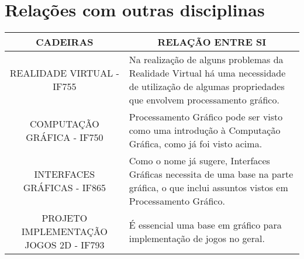\documentclass[a4paper]{article}
\begin{document}
\section*{Relações com outras disciplinas}

\begin{table}[H]
\centering
\begin{tabular}{@{}|l p{7cm}|@{}}
\toprule
\multicolumn{1}{|c|}{\textbf{CADEIRAS}}                                                 &\multicolumn{1}{|c|}{\textbf{RELAÇÃO ENTRE SI}}                                                                                                                                                                                                                                                                                                                \\ \midrule
\multicolumn{1}{|c|}{REALIDADE VIRTUAL - IF755} & Na realização de alguns problemas da Realidade Virtual há uma necessidade de utilização de algumas propriedades que envolvem processamento gráfico.                                                                                                                                                                                                            \\ \midrule
\multicolumn{1}{|c|}{COMPUTAÇÃO GRÁFICA - IF750}                                               & Processamento Gráfico pode ser visto como uma introdução à Computação Gráfica, como já foi visto acima.                                                                                                                                                                                                                                                        \\ \midrule
\multicolumn{1}{|c|}{INTERFACES GRÁFICAS - IF865}                                              & Como o nome já sugere, Interfaces Gráficas necessita de uma base na parte gráfica, o que inclui assuntos vistos em Processamento Gráfico.                                                                                                                                                                                                                      \\ \midrule
\multicolumn{1}{|c|}{PROJETO IMPLEMENTAÇÃO JOGOS 2D - IF793}                                   & É essencial uma base em gráfico para implementação de jogos no geral.                                                                                                                                                                                                                                                                                          \\ \midrule

\end{tabular}
\end{table}
\end{document}
